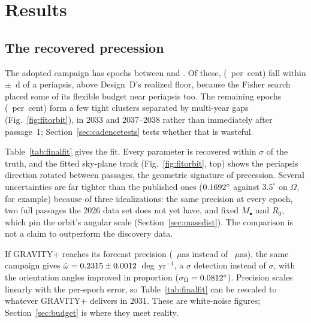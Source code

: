 \documentclass{aastex701}
\begin{document}
\section{Results}
\label{sec:results}

\subsection{The recovered precession}
\label{sec:recovered}

The adopted campaign has \campaignNEpochs{} epochs between \campaignEpochMin{} and \campaignEpochMax{}. Of these, \campaignNDense{} (\campaignDensePct{}~per~cent) fall within $\pm$\campaignDenseHalfWidthDays{}~d of a periapsis, above Design~D's realized floor, because the Fisher search placed some of its flexible budget near periapsis too. The remaining \campaignNSparse{} epochs (\campaignSparsePct{}~per~cent) form a few tight clusters separated by multi-year gaps (Fig.~\ref{fig:fitorbit}), in 2033 and 2037--2038 rather than immediately after passage~1; Section~\ref{sec:cadencetests} tests whether that is wasteful.

Table~\ref{tab:finalfit} gives the fit. Every parameter is recovered within \fitPullMax{}$\sigma$ of the truth, and the fitted sky-plane track (Fig.~\ref{fig:fitorbit}, top) shows the periapsis direction rotated between passages, the geometric signature of precession. Several uncertainties are far tighter than the published ones ($0.1692^\circ$ against $3.5^\circ$ on $\Omega$, for example) because of three idealizations: the same precision at every epoch, two full passages the 2026 data set does not yet have, and fixed $M_\bullet$ and $R_0$, which pin the orbit's angular scale (Section~\ref{sec:massdist}). The comparison is not a claim to outperform the discovery data.

If GRAVITY+ reaches its forecast precision (\precisionForecastUas{}~$\mu$as instead of \precisionAchievedUas{}~$\mu$as), the same campaign gives $\dot\omega = 0.2315 \pm 0.0012$~deg~yr$^{-1}$, a \precisionForecastDetectionNsigma{}$\sigma$ detection instead of \precisionAchievedDetectionNsigma{}$\sigma$, with the orientation angles improved in proportion ($\sigma_\Omega = 0.0812^\circ$). Precision scales linearly with the per-epoch error, so Table~\ref{tab:finalfit} can be rescaled to whatever GRAVITY+ delivers in 2031. These are white-noise figures; Section~\ref{sec:budget} is where they meet reality.
\end{document}
